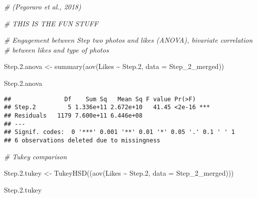 \documentclass[
]{article}
\newenvironment{Shaded}{\begin{snugshade}}{\end{snugshade}}
\newcommand{\AttributeTok}[1]{\textcolor[rgb]{0.77,0.63,0.00}{#1}}
\newcommand{\CommentTok}[1]{\textcolor[rgb]{0.56,0.35,0.01}{\textit{#1}}}
\newcommand{\FloatTok}[1]{\textcolor[rgb]{0.00,0.00,0.81}{#1}}
\newcommand{\FunctionTok}[1]{\textcolor[rgb]{0.00,0.00,0.00}{#1}}
\newcommand{\NormalTok}[1]{#1}
\newcommand{\OtherTok}[1]{\textcolor[rgb]{0.56,0.35,0.01}{#1}}
\newcommand{\SpecialCharTok}[1]{\textcolor[rgb]{0.00,0.00,0.00}{#1}}
\begin{document}
\begin{Shaded}
\begin{Highlighting}[]
\CommentTok{\# (Pegoraro et al., 2018)}

\CommentTok{\# THIS IS THE FUN STUFF}

\CommentTok{\# Engagement between Step two photos and likes (ANOVA), bivariate correlation}
\CommentTok{\# between likes and type of photos }

\NormalTok{Step.}\FloatTok{2.}\NormalTok{anova }\OtherTok{\textless{}{-}}
  \FunctionTok{summary}\NormalTok{(}\FunctionTok{aov}\NormalTok{(Likes }\SpecialCharTok{\textasciitilde{}}\NormalTok{ Step}\FloatTok{.2}\NormalTok{, }\AttributeTok{data =}\NormalTok{ Step\_2\_merged))}

\NormalTok{Step.}\FloatTok{2.}\NormalTok{anova}
\end{Highlighting}
\end{Shaded}

\begin{verbatim}
##               Df    Sum Sq   Mean Sq F value Pr(>F)    
## Step.2         5 1.336e+11 2.672e+10   41.45 <2e-16 ***
## Residuals   1179 7.600e+11 6.446e+08                   
## ---
## Signif. codes:  0 '***' 0.001 '**' 0.01 '*' 0.05 '.' 0.1 ' ' 1
## 6 observations deleted due to missingness
\end{verbatim}

\begin{Shaded}
\begin{Highlighting}[]
\CommentTok{\# Tukey comparison}

\NormalTok{Step.}\FloatTok{2.}\NormalTok{tukey }\OtherTok{\textless{}{-}} \FunctionTok{TukeyHSD}\NormalTok{((}\FunctionTok{aov}\NormalTok{(Likes }\SpecialCharTok{\textasciitilde{}}\NormalTok{ Step}\FloatTok{.2}\NormalTok{, }\AttributeTok{data =}\NormalTok{ Step\_2\_merged)))}

\NormalTok{Step.}\FloatTok{2.}\NormalTok{tukey}
\end{Highlighting}
\end{Shaded}
\end{document}

